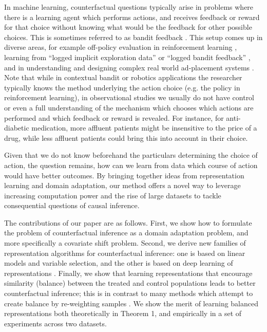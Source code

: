 In machine learning, counterfactual questions typically arise in problems where there is a learning agent which performs actions, and receives feedback or reward for that choice without knowing what would be the feedback for other possible choices. This is sometimes referred to as bandit feedback \citep{beygelzimer2010contextual}. This setup comes up in diverse areas, for example off-policy evaluation in reinforcement learning \citep{sutton1998reinforcement}, learning from ``logged implicit exploration data'' \citep{strehl2010learning} or ``logged bandit feedback'' \citep{swaminathan2015batch}, and in understanding and designing complex real world ad-placement systems \cite{bottou2013counterfactual}.
Note that while in contextual bandit or robotics applications the researcher typically knows the method underlying the action choice (e.g. the policy in reinforcement learning), in observational studies we usually do not have control or even a full understanding of the mechanism which chooses which actions are performed and which feedback or reward is revealed. For instance, for anti-diabetic medication, more affluent patients might be insensitive to the price of a drug, while less affluent patients could bring this into account in their choice.

Given that we do not know beforehand the particulars determining the choice of action, the question remains, how can we learn from data which course of action would have better outcomes. By bringing together ideas from representation learning and domain adaptation, our method offers a novel way to leverage increasing computation power and the rise of large datasets to tackle consequential questions of causal inference.

The contributions of our paper are as follows. First, we show how to formulate the problem of counterfactual inference as a domain adaptation problem, and more specifically a covariate shift problem. Second, we derive new families of representation algorithms for counterfactual inference: one is based on linear models and variable selection, and the other is based on deep learning of representations \citep{bengio2013representation}. Finally, we show that learning representations that encourage similarity (balance) between the treated and control populations leads to better counterfactual inference; this is in contrast to many methods which attempt to create balance by re-weighting samples \citep[e.g.,][]{bang2005doubly,dudik2011doubly,austin2011introduction,swaminathan2015batch}. We show the merit of learning balanced representations both theoretically in Theorem 1, and empirically in a set of experiments across two datasets.



